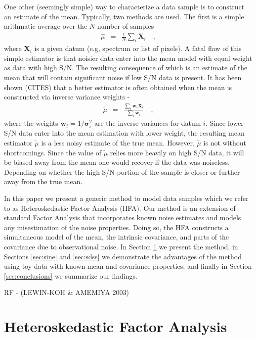 \documentclass[12pt,preprint]{aastex}
\newcommand{\mbf}[1]{\boldsymbol{#1}}
\newcommand{\w}{\mbf{w}}
\newcommand{\X}{\mbf{X}}
\newcommand{\var}{\mbf{\sigma}^2}
\begin{document}
One other (seemingly simple) way to characterize a data sample is to construct 
an estimate of the mean.  Typically, two methods are used.  The first is a simple 
arithmatic average over the $N$ number of samples - 
\begin{eqnarray}
\hat{\mu} & = &\frac{1}{N} \sum_i \X_i
\quad,
\label{eq:standardmean}
\end{eqnarray}
where $\X_i$ is a given datum (e.g, spectrum or list of pixels).   A fatal flaw of this 
simple estimator is that noisier data enter into the mean model with equal weight as 
data with high S/N.  The resulting consequence of which is an estimate of the mean 
that will contain significant noise if low S/N data is present.  It has been shown (CITES) 
that a better estimator is often obtained when the mean is constructed via inverse 
variance weights - 
\begin{eqnarray}
\tilde{\mu} & = &\frac{ \sum_i \w_i \X_i } {\sum_i \w_i}
\quad,
\label{eq:weightedmean}
\end{eqnarray}
where the weights $\w_i = 1 / \var_i$ are the inverse variances for datum $i$.  Since 
lower S/N data enter into the mean estimation with lower weight, the resulting mean 
estimator $\tilde{\mu}$ is a less noisy estimate of the true mean.  However, 
$\tilde{\mu}$ is not without shortcomings.  Since the value of $\tilde{\mu}$ relies 
more heavily on high S/N data, it will be biased away from the mean one would 
recover if the data was noiseless.  Depending on whether the high S/N portion of the 
sample is closer or further away from the true mean.

In this paper we present a generic method to model data samples which we refer 
to as Heteroskedastic Factor Analysis (HFA).  Our method is an extension of standard 
Factor Analysis that incorporates known noise estimates and models 
any misestimation of the noise properties.  Doing so, the HFA constructs a simultaneous 
model of the mean, the intrinsic covariance, and parts of the covariance due to 
observational noise.  In Section \ref{sec:hfa} we present the method, in Sections
\ref{sec:sine} and \ref{sec:sdss} we demonstrate the advantages of the method using toy data with known 
mean and covariance properties, and finally in Section \ref{sec:conclusions} we summarize 
our findings.


RF - (LEWIN-KOH \& AMEMIYA 2003)

\section{Heteroskedastic Factor Analysis}
\label{sec:hfa}
\end{document}
